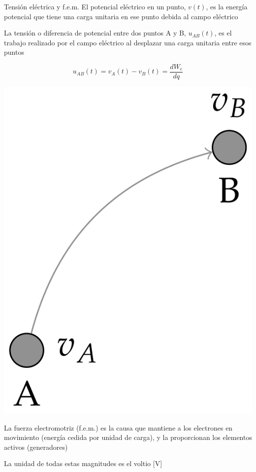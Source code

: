 \documentclass[aspectratio=169, xcolor={usenames,svgnames,dvipsnames}]{beamer}
\begin{document}
\begin{frame}{Tensión eléctrica y f.e.m.}
El \alert{potencial eléctrico en un punto}, \(v(t)\),  es la energía potencial que tiene una carga unitaria en ese punto debida al campo eléctrico

La \alert{tensión} o \alert{diferencia de potencial entre dos puntos} A y B, \(u_{AB}(t)\), es el trabajo realizado por el campo eléctrico al desplazar una carga unitaria entre esos puntos

\begin{minipage}[c]{0.5\linewidth}
\begin{equation*}
  u_{AB}(t) = v_A(t) - v_B(t) = \frac{dW_{e}}{dq}
\end{equation*}
\end{minipage}
\hfill
\begin{minipage}[c]{0.4\linewidth}
\begin{center}
\includegraphics[height=0.3\textheight]{../figs/tension_puntos.PNG}
\end{center}
\end{minipage}

La \alert{fuerza electromotriz} (f.e.m.) es la causa que mantiene a los electrones en movimiento (energía cedida por unidad de carga), y la proporcionan los elementos activos (\alert{generadores})

La \alert{unidad} de todas estas magnitudes es el \alert{voltio} [V]
\end{frame}
\end{document}
